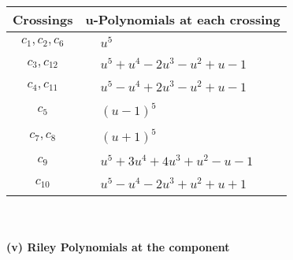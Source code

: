 \documentclass[1p]{elsarticle_modified}
\theoremstyle{definition}
\begin{document}
\begin{tabular}{m{50pt}|m{274pt}}
Crossings & \hspace{64pt}u-Polynomials at each crossing \\
\hline $$\begin{aligned}c_{1},c_{2},c_{6}\end{aligned}$$&$\begin{aligned}
&u^5
\end{aligned}$\\
\hline $$\begin{aligned}c_{3},c_{12}\end{aligned}$$&$\begin{aligned}
&u^5+u^4-2 u^3- u^2+u-1
\end{aligned}$\\
\hline $$\begin{aligned}c_{4},c_{11}\end{aligned}$$&$\begin{aligned}
&u^5- u^4+2 u^3- u^2+u-1
\end{aligned}$\\
\hline $$\begin{aligned}c_{5}\end{aligned}$$&$\begin{aligned}
&(u-1)^5
\end{aligned}$\\
\hline $$\begin{aligned}c_{7},c_{8}\end{aligned}$$&$\begin{aligned}
&(u+1)^5
\end{aligned}$\\
\hline $$\begin{aligned}c_{9}\end{aligned}$$&$\begin{aligned}
&u^5+3 u^4+4 u^3+u^2- u-1
\end{aligned}$\\
\hline $$\begin{aligned}c_{10}\end{aligned}$$&$\begin{aligned}
&u^5- u^4-2 u^3+u^2+u+1
\end{aligned}$\\
\hline
\end{tabular}\\~\\
\newpage\renewcommand{\arraystretch}{1}
\flushleft \textbf{(v) Riley Polynomials at the component}\newline \\
\end{document}
